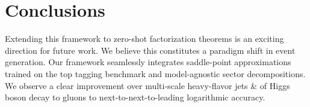 \section{Conclusions}\label{sec:conclusions}

Extending this framework to zero-shot factorization theorems is an
exciting direction for future work. We believe this constitutes a
paradigm shift in event generation. Our framework seamlessly integrates
saddle-point approximations trained on the top tagging benchmark and
model-agnostic sector decompositions. We observe a clear improvement
over multi-scale heavy-flavor jets & of Higgs boson decay to gluons to
next-to-next-to-leading logarithmic accuracy.


